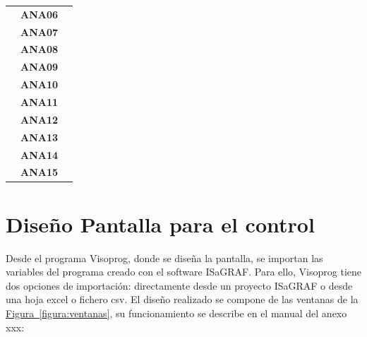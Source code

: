 \begin{center}
\begin{longtable}{|p{3cm}|p{3cm}|p{9cm}|}
      & \centering\textbf{ANA06} &  \\ \cline{2-2}
      & \centering\textbf{ANA07} &  \\ \cline{2-2}
      & \centering\textbf{ANA08} &  \\ \cline{2-2}
      & \centering\textbf{ANA09} &  \\ \cline{2-2}
      & \centering\textbf{ANA10} &  \\ \cline{2-2}
      & \centering\textbf{ANA11} &  \\ \cline{2-2}
      & \centering\textbf{ANA12} &  \\ \cline{2-2}
      & \centering\textbf{ANA13} &  \\ \cline{2-2}
      & \centering\textbf{ANA14} &  \\ \cline{2-2}
      & \centering\textbf{ANA15} &  \\ 
  \end{longtable}
  \end{center}

\section{Diseño Pantalla para el control}
\label{sec:programacionpantalla}
Desde el programa Visoprog, donde se diseña la pantalla, se importan las variables del programa creado con el software ISaGRAF. Para ello, Visoprog tiene dos opciones de importación: directamente desde un proyecto ISaGRAF o desde una hoja excel o fichero csv. El diseño realizado se compone de las ventanas de la \hyperref[figura:ventanas]{Figura~\ref{figura:ventanas}}, su funcionamiento se describe en el manual del anexo xxx:

\begin{figure}[H]
  \centering
 \end{figure}

